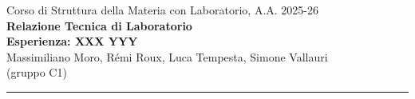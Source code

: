 \documentclass[a4paper,12pt]{article}
\begin{document}
\begin{center}

\small{Corso di Struttura della Materia con Laboratorio, A.A. 2025-26} \\
\vspace{0.4cm}
\small{\textbf{Relazione Tecnica di Laboratorio}}\\
\vspace{0.4cm}
\LARGE{\textbf{Esperienza: XXX YYY}}
\vspace{0.4cm} \\
\normalsize{Massimiliano Moro, Rémi Roux, Luca Tempesta, Simone Vallauri} \\
\vspace{0.1cm}
\small (gruppo C1) \\

\vspace{0.1cm}
\medskip
\normalsize
\end{center}
\vspace{0.4cm}
{\color{gray}\hrule}
\medskip

\begin{abstract}
\noindent 
\end{abstract}

\tableofcontents
\clearpage

\pagestyle{fancy}
\fancyhead{} %













\clearpage

\appendix



\clearpage




\end{document}
